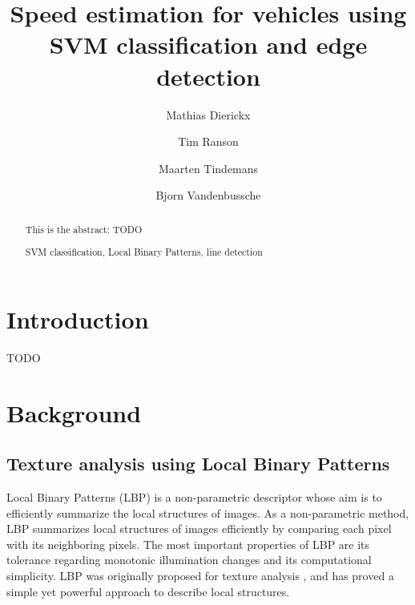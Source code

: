 \documentclass[runningheads,a4paper]{llncs}
\newcommand{\keywords}[1]{\par\addvspace\baselineskip
\noindent\keywordname\enspace\ignorespaces#1}
\begin{document}
\mainmatter  %

\title{Speed estimation for vehicles using \\SVM classification and edge detection}


%
%
\author{Mathias Dierickx\and Tim Ranson\and Maarten Tindemans\and Bjorn Vandenbussche}
%


%
%

\maketitle


\begin{abstract}
This is the abstract: TODO
\keywords{SVM classification, Local Binary Patterns, line detection}
\end{abstract}


\section{Introduction}
TODO

\section{Background}
\subsection{Texture analysis using Local Binary Patterns}
Local Binary Patterns (LBP) \cite{Huang2011} is a non-parametric descriptor whose aim is to efficiently summarize the local structures of images. As a non-parametric method, LBP summarizes local structures of images efficiently by comparing each pixel with its neighboring pixels. The most important properties of LBP are its tolerance regarding monotonic illumination changes and its computational simplicity. LBP was originally proposed for texture analysis \cite{Ojala1996}, and has proved a simple yet powerful approach to describe local structures. 
\end{document}
